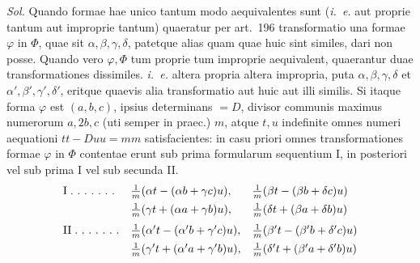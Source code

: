 \textit{Sol.} Quando formae hae unico tantum modo aequivalentes sunt (\textit{i.~e.} aut proprie tantum aut improprie tantum) quaeratur per art.~196 transformatio una formae \(\varphi\) in \(\Phi\), quae sit \(\alpha,\beta,\gamma,\delta\), patetque alias quam quae huic sint similes, dari non posse. Quando vero \(\varphi,\Phi\) tum proprie tum improprie aequivalent, quaerantur duae transformationes dissimiles. \textit{i.~e.} altera propria altera impropria, puta \(\alpha,\beta,\gamma,\delta\) et \(\alpha',\beta',\gamma',\delta'\), eritque quaevis alia transformatio aut huic aut illi similis. Si itaque forma \(\varphi\) est \((a,b,c)\), ipsius determinans \(=D\), divisor communis maximus numerorum \(a,2b,c\) (uti semper in praec.) \(m\), atque \(t,u\) indefinite omnes numeri aequationi \(tt-Duu=mm\) satisfacientes: in casu priori omnes transformationes formae \(\varphi\) in \(\Phi\) contentae erunt sub prima formularum sequentium I, in posteriori vel sub prima I vel sub secunda II.
\[
\begin{array}{@{}lll@{}}
\mathrm{I}\;\ldotp\,\ldotp\,\ldotp\,\ldotp\,\ldotp\,\ldotp\,\ldotp&\frac1m(\alpha t-(\alpha b+\gamma c)u),&\frac1m(\beta t-(\beta b+\delta c)u)\\[1ex]
&\frac1m(\gamma t+(\alpha a+\gamma b)u),&\frac1m(\delta t+(\beta a+\delta b)u)\\[1.5ex]
\mathrm{II}\;\ldotp\,\ldotp\,\ldotp\,\ldotp\,\ldotp\,\ldotp\,\ldotp&\frac1m(\alpha't-(\alpha'b+\gamma'c)u),&\frac1m(\beta't-(\beta'b+\delta'c)u)\\[1ex]
&\frac1m(\gamma't+(\alpha'a+\gamma'b)u),&\frac1m(\delta't+(\beta'a+\delta'b)u)
\end{array}
\]
